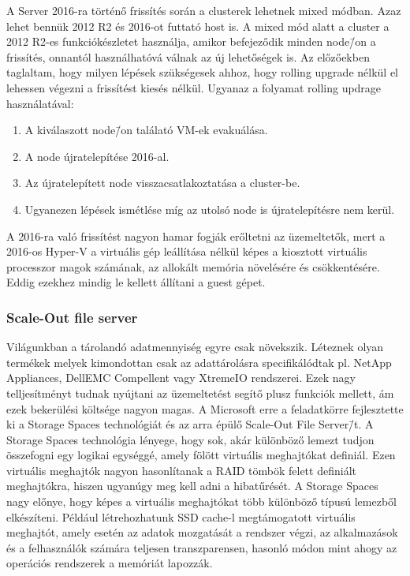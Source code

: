 \documentclass[12pt,oneside,justify,table]{book}
\begin{document}
A Server 2016-ra történő frissítés során a clusterek lehetnek mixed módban. Azaz lehet bennük 2012 R2 és 2016-ot futtató host is. A mixed mód alatt a cluster a 2012 R2-es funkciókészletet használja, amikor befejeződik minden node\=/on a frissítés, onnantól használhatóvá válnak az új lehetőségek is. Az előzőekben taglaltam, hogy milyen lépések szükségesek ahhoz, hogy rolling upgrade nélkül el lehessen végezni a frissítést kiesés nélkül. 
Ugyanaz a folyamat rolling updrage használatával:
\begin{enumerate}
	\item A kiválaszott node\=/on találató VM-ek evakuálása.
	\item A node újratelepítése 2016-al.
	\item Az újratelepített node visszacsatlakoztatása a cluster-be. 
	\item Ugyanezen lépések ismétlése míg az utolsó node is újratelepítésre nem kerül.
\end{enumerate}

A 2016-ra való frissítést nagyon hamar fogják erőltetni az üzemeltetők, mert a 2016-os Hyper-V a virtuális gép leállítása nélkül képes a kiosztott virtuális processzor magok számának, az allokált memória növelésére és csökkentésére. Eddig ezekhez mindig le kellett állítani a guest gépet. 

\subsubsection{Scale-Out file server}

Világunkban a tárolandó adatmennyiség egyre csak növekszik. Léteznek olyan termékek melyek kimondottan csak az adattárolásra specifikálódtak pl. NetApp Appliances, DellEMC Compellent vagy XtremeIO rendszerei. Ezek nagy telljesítményt tudnak nyújtani az üzemeltetést segítő plusz funkciók mellett, ám ezek bekerülési költsége nagyon magas.
A Microsoft erre a feladatkörre fejlesztette ki a Storage Spaces technológiát és az arra épülő Scale-Out File Server\=/t.
\newline
A Storage Spaces technológia lényege, hogy sok, akár különböző lemezt tudjon összefogni egy logikai egységgé, amely fölött virtuális meghajtókat definiál. Ezen virtuális meghajtók nagyon hasonlítanak a RAID tömbök felett definiált meghajtókra, hiszen ugyanúgy meg kell adni a hibatűrését.  A Storage Spaces nagy előnye, hogy képes a virtuális meghajtókat több különböző típusú lemezből elkészíteni. Például létrehozhatunk SSD cache-l megtámogatott virtuális meghajtót, amely esetén az adatok mozgatását a rendszer végzi, az alkalmazások és a felhasználók számára teljesen transzparensen, hasonló módon mint ahogy az operációs rendszerek a memóriát lapozzák.
\end{document}
